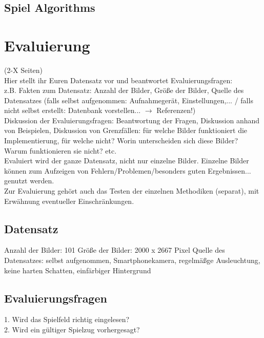\documentclass[paper=A4, deutsch]{scrartcl}
\begin{document}
\subsection{Spiel Algorithms}



\section{Evaluierung}
(2-X Seiten)\\
Hier stellt ihr Euren Datensatz vor und beantwortet Evaluierungsfragen:\\
z.B. Fakten zum Datensatz: Anzahl der Bilder, Größe der Bilder, Quelle des Datensatzes (falls selbst aufgenommen: Aufnahmegerät, Einstellungen,... / falls nicht selbst erstellt: Datenbank vorstellen... $\to$ Referenzen!)\\
Diskussion der Evaluierungsfragen: Beantwortung der Fragen, Diskussion anhand von Beispielen, Diskussion von Grenzfällen: für welche Bilder funktioniert die Implementierung, für welche nicht? Worin unterscheiden sich diese Bilder? Warum funktionieren sie nicht? etc.\\
Evaluiert wird der ganze Datensatz, nicht nur einzelne Bilder. Einzelne Bilder können zum Aufzeigen von Fehlern/Problemen/besonders guten Ergebnissen... genutzt werden.\\
Zur Evaluierung gehört auch das Testen der einzelnen Methodiken (separat), mit Erwähnung eventueller Einschränkungen.

\subsection{Datensatz}
Anzahl der Bilder: 101
Größe der Bilder: 2000 x 2667 Pixel
Quelle des Datensatzes: selbst aufgenommen, Smartphonekamera, regelmäßge Ausleuchtung, keine harten Schatten, einfärbiger Hintergrund

\subsection{Evaluierungsfragen}
1. Wird das Spielfeld richtig eingelesen?\\


2. Wird ein gültiger Spielzug vorhergesagt?



\end{document}

